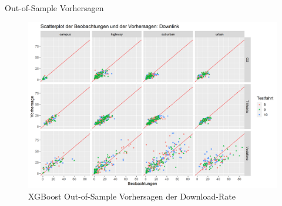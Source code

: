\begin{frame}{Out-of-Sample Vorhersagen}
    \begin{figure}[h]
        \centering
        \includegraphics[scale=0.33]{plots/xgboost/downlink/scatter_colored_axes_fixed}
        \caption{XGBoost Out-of-Sample Vorhersagen der Download-Rate}
        \label{xgboost_scatter_colored_downlink}
    \end{figure}
\end{frame}